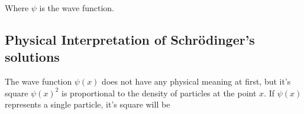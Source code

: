 \documentclass{article}[10pt]
\begin{document}
Where $\psi$ is the wave function.
\subsection{Physical Interpretation of Schrödinger's solutions}

The wave function $\psi(x)$ does not have any physical meaning at first, but
it's square $\psi{(x)}^2$ is proportional to the density of particles at the point
$x$. If $\psi(x)$ represents a single particle, it's square will be
\end{document}
